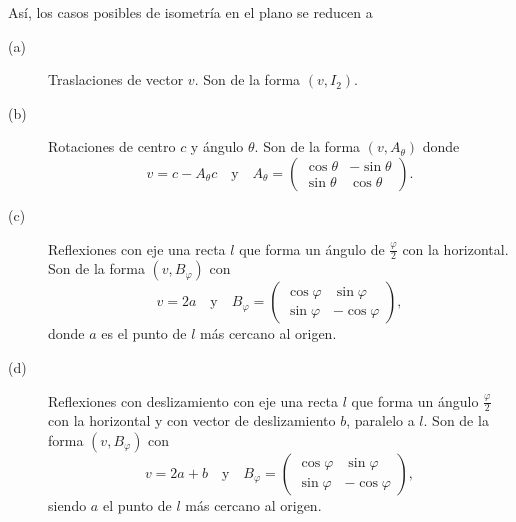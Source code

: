 \begin{ftheorem}[]
\normalfont Así, los casos posibles de isometría en el plano se reducen a 
\begin{description}
\item[(a)] Traslaciones de vector $\displaystyle v $. Son de la forma $\displaystyle \left(v, I_{2}\right) $.
\item[(b)] Rotaciones de centro $\displaystyle c $ y ángulo $\displaystyle \theta $. Son de la forma $\displaystyle \left(v, A_{\theta}\right) $ donde
	\[v = c - A_{\theta }c \quad \text{y} \quad A_{\theta} = \begin{pmatrix} \cos\theta & -\sin\theta \\ \sin\theta & \cos\theta \end{pmatrix} .\]
\item[(c)] Reflexiones con eje una recta $\displaystyle l $ que forma un ángulo de $\displaystyle \frac{\varphi}{2} $ con la horizontal. Son de la forma $\displaystyle \left(v, B_{\varphi}\right) $ con 
	\[v = 2a \quad \text{y} \quad B_{\varphi} =\begin{pmatrix} \cos\varphi & \sin\varphi \\ \sin\varphi & -\cos\varphi \end{pmatrix} ,\]
donde $\displaystyle a $ es el punto de $\displaystyle l $ más cercano al origen.
\item[(d)] Reflexiones con deslizamiento con eje una recta $\displaystyle l $ que forma un ángulo $\displaystyle \frac{\varphi}{2} $ con la horizontal y con vector de deslizamiento $\displaystyle b $, paralelo a $\displaystyle l $. Son de la forma $\displaystyle \left(v, B_{\varphi}\right) $ con 
	\[v = 2a+b \quad \text{y} \quad B_{\varphi} = \begin{pmatrix} \cos\varphi & \sin\varphi \\ \sin\varphi & -\cos\varphi \end{pmatrix},\]
siendo $\displaystyle a $ el punto de $\displaystyle l $ más cercano al origen.
\end{description}
\end{ftheorem}

